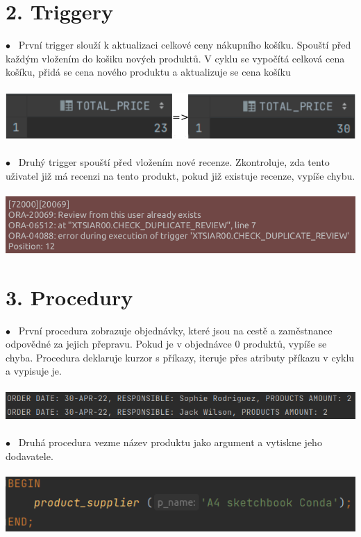 \documentclass[12pt]{article}
\begin{document}
\newpage
\section*{2. Triggery}
    $\bullet$~ První trigger slouží k aktualizaci celkové ceny nákupního košíku. Spouští před každým vložením do košiku nových produktů. V cyklu se vypočítá celková cena košíku, přidá se cena nového produktu a aktualizuje se cena košíku
    \\
    \\
    \includegraphics[scale=0.54]{1-2.png}
    \\
    \\
    $\bullet$~ Druhý trigger spouští před vložením nové recenze. Zkontroluje, zda tento uživatel již má recenzi na tento produkt, pokud již existuje recenze, vypíše chybu.
    \\
    \\
    \includegraphics[scale=0.6075]{3.png}

\section*{3. Procedury}
    $\bullet$~ První procedura zobrazuje objednávky, které jsou na cestě a zaměstnance odpovědné za jejich přepravu. Pokud je v objednávce 0 produktů, vypíše se chyba. Procedura deklaruje kurzor s příkazy, iteruje přes atributy příkazu v cyklu a vypisuje je.
    \\
    \\
    \includegraphics[scale=0.66]{4.png}
    \\
    \\
    $\bullet$~ Druhá procedura vezme název produktu jako argument a vytiskne jeho dodavatele. 
    \\
    \\
    \includegraphics[scale=0.66]{5.png}
\end{document}
